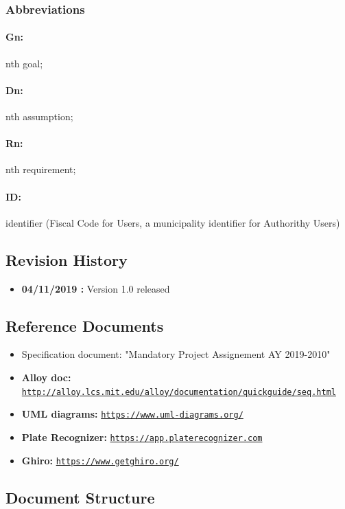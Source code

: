\documentclass{article}
\begin{document}
\subsubsection{Abbreviations}
\paragraph{Gn:} nth goal; \paragraph{Dn:} nth assumption; \paragraph{Rn:} nth
requirement; \paragraph{ID: } identifier (Fiscal Code for Users, a
municipality identifier for Authorithy Users)
\subsection{Revision History}
\begin{itemize}
    \item \textbf{04/11/2019 :} Version 1.0 released
\end{itemize}
\subsection{Reference Documents}
\begin{itemize}
    \item Specification document: "Mandatory Project Assignement AY 2019-2010"
    \item \textbf{Alloy doc:}
    \href{http://alloy.lcs.mit.edu/alloy/documentation/quickguide/seq.html}{\texttt{http://alloy.lcs.mit.edu/alloy/documentation/quickguide/seq.html}}
    \item \textbf{UML diagrams:} \href{https://www.uml-diagrams.org/}{\texttt{https://www.uml-diagrams.org/}}
    \item \textbf{Plate Recognizer:} \href{https://app.platerecognizer.com}{\texttt{https://app.platerecognizer.com}}
    \item \textbf{Ghiro:} \href{https://www.getghiro.org/}{\texttt{https://www.getghiro.org/}}
\end{itemize}
\newpage
\subsection{Document Structure}
\end{document}
